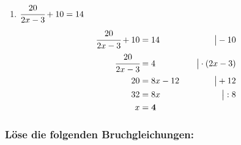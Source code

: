 \documentclass[a4paper,10pt]{article} %
\begin{document}
\begin{enumerate}[label=\alph*)]
  \item \(\cfrac{20}{2x - 3} + 10 = 14\)
  \[
    \begin{aligned}
      \cfrac{20}{2x - 3} + 10 &= 14 &\quad\big| - 10 \\
      \cfrac{20}{2x - 3} &= 4 &\quad\big| \cdot (2x - 3) \\
      20 &= 8x - 12 &\quad\big| + 12 \\
      32 &= 8x &\quad\big| : 8 \\
      x &= \mathbf{4}
    \end{aligned}
  \]

  \end{enumerate}

\subsubsection{Löse die folgenden Bruchgleichungen:}
\end{document}
